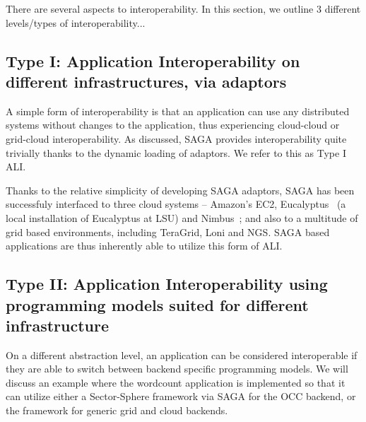 \documentclass[3p,twocolumn]{elsarticle}
\begin{document}

There are several aspects to interoperability. In this section, we
outline 3 different levels/types of interoperability...


\subsection{Type I: Application Interoperability on different
  infrastructures, via adaptors}


A simple form of interoperability is that an application can use any
distributed systems without changes to the application, thus
experiencing cloud-cloud or grid-cloud interoperability.  As
discussed, SAGA provides interoperability quite trivially thanks to
the dynamic loading of adaptors.  We refer to this as Type I ALI.

Thanks to the relative simplicity of developing SAGA adaptors, SAGA
has been successfuly interfaced to three cloud systems -- Amazon's
EC2, Eucalyptus~\cite{eucalyptus} (a local installation of Eucalyptus
at LSU) and Nimbus~\cite{nimbus};  and also to a multitude of grid
based environments, including TeraGrid, Loni and NGS.  SAGA based
applications are thus inherently able to utilize this form of ALI.


\subsection{Type II: Application Interoperability using programming
  models suited for different infrastructure}


On a different abstraction level, an application can be considered
interoperable if they are able to switch between backend specific
programming models.  We will discuss an example where the wordcount
application is implemented so that it can utilize either a
Sector-Sphere framework via SAGA for the OCC backend, or the \smr
framework for generic grid and cloud backends.
\end{document}
